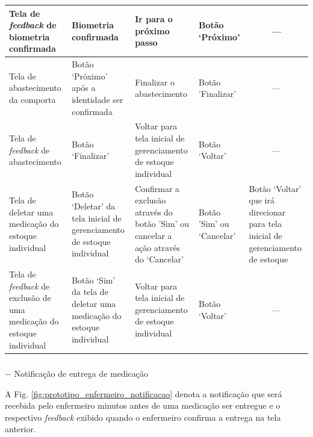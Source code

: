 \begin{table}[H]
\begin{adjustbox}{max width = \textwidth}
\begin{tabular}{|L{5cm}|L{4cm}|L{6cm}|L{4cm}|L{4cm}|}
             Tela de \textit{feedback} de biometria confirmada & Biometria confirmada & Ir para o próximo passo & Botão `Próximo'  &  \\ \hline
             Tela de abastecimento da comporta & Botão `Próximo' após a identidade ser confirmada & Finalizar o abastecimento & Botão 'Finalizar'  &  \\ \hline
             Tela de \textit{feedback} de abastecimento & Botão `Finalizar' & Voltar para tela inicial de gerenciamento de estoque individual & Botão `Voltar' &  \\ \hline
             Tela de deletar uma medicação do estoque individual & Botão `Deletar' da tela inicial de gerenciamento de estoque individual &  Confirmar a exclusão através do botão 'Sim' ou cancelar a ação através do `Cancelar'  & Botão 'Sim' ou `Cancelar' & Botão `Voltar' que irá direcionar para tela inicial de gerenciamento de estoque \\ \hline
             Tela de \textit{feedback} de exclusão de uma medicação do estoque individual & Botão `Sim' da tela de deletar uma medicação do estoque individual & Voltar para tela inicial de gerenciamento de estoque individual  & Botão `Voltar' &  \\ \hline
             
        \end{tabular}
    \end{adjustbox}
\end{table}

\subparagraph*{} $-$ Notificação de entrega de medicação

A Fig. \ref{fig:prototipo_enfermeiro_notificacao} denota a notificação que será recebida pelo enfermeiro minutos antes de uma medicação ser entregue e o respectivo \textit{feedback} exibido quando o enfermeiro confirma a entrega na tela anterior.

